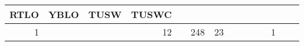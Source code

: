 \documentclass[]{article}
\begin{document}
{\begin{longtable}[]{@{}rrrrrrrrrrrrrr@{}}
\begin{minipage}[b]{0.04\columnwidth}
RTLO\strut
\end{minipage} & \begin{minipage}[b]{0.04\columnwidth}\raggedleft\strut
YBLO\strut
\end{minipage} & \begin{minipage}[b]{0.04\columnwidth}\raggedleft\strut
TUSW\strut
\end{minipage} & \begin{minipage}[b]{0.04\columnwidth}\raggedleft\strut
TUSWC\strut
\end{minipage}\tabularnewline
\midrule
\endhead
\begin{minipage}[t]{0.05\columnwidth}\raggedleft\strut
1\strut
\end{minipage} & \begin{minipage}[t]{0.05\columnwidth}\raggedleft\strut
\strut
\end{minipage} & \begin{minipage}[t]{0.05\columnwidth}\raggedleft\strut
\strut
\end{minipage} & \begin{minipage}[t]{0.05\columnwidth}\raggedleft\strut
12\strut
\end{minipage} & \begin{minipage}[t]{0.05\columnwidth}\raggedleft\strut
\strut
\end{minipage} & \begin{minipage}[t]{0.05\columnwidth}\raggedleft\strut
248\strut
\end{minipage} & \begin{minipage}[t]{0.05\columnwidth}\raggedleft\strut
23\strut
\end{minipage} & \begin{minipage}[t]{0.04\columnwidth}\raggedleft\strut
\strut
\end{minipage} & \begin{minipage}[t]{0.05\columnwidth}\raggedleft\strut
\strut
\end{minipage} & \begin{minipage}[t]{0.04\columnwidth}\raggedleft\strut
\strut
\end{minipage} & \begin{minipage}[t]{0.04\columnwidth}\raggedleft\strut
\strut
\end{minipage} & \begin{minipage}[t]{0.04\columnwidth}\raggedleft\strut
1\strut
\end{minipage} & \begin{minipage}[t]{0.04\columnwidth}\raggedleft\strut

\end{minipage}
\end{longtable}}
\end{document}

